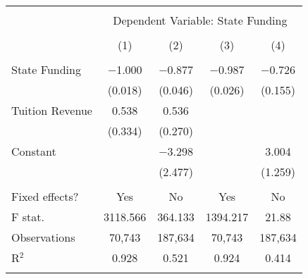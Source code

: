 
\begin{tabular}{@{\extracolsep{5pt}}lcccc} 
\\[-1.8ex]\hline 
\hline \\[-1.8ex] 
 & \multicolumn{4}{c}{Dependent Variable: State Funding} \\ 
\cline{2-5} 
\\[-1.8ex] & (1) & (2) & (3) & (4)\\ 
\hline \\[-1.8ex] 
  State Funding & $-$1.000 & $-$0.877 & $-$0.987 & $-$0.726 \\ 
  & (0.018) & (0.046) & (0.026) & (0.155) \\ 
  Tuition Revenue & 0.538 & 0.536 &  &  \\ 
  & (0.334) & (0.270) &  &  \\ 
  Constant &  & $-$3.298 &  & 3.004 \\ 
  &  & (2.477) &  & (1.259) \\ 
 \hline \\[-1.8ex] 
Fixed effects? & Yes & No & Yes & No \\ 
F stat. & 3118.566 & 364.133 & 1394.217 & 21.88 \\ 
Observations & 70,743 & 187,634 & 70,743 & 187,634 \\ 
R$^{2}$ & 0.928 & 0.521 & 0.924 & 0.414 \\ 
\hline 
\hline \\[-1.8ex] 
\end{tabular} 
